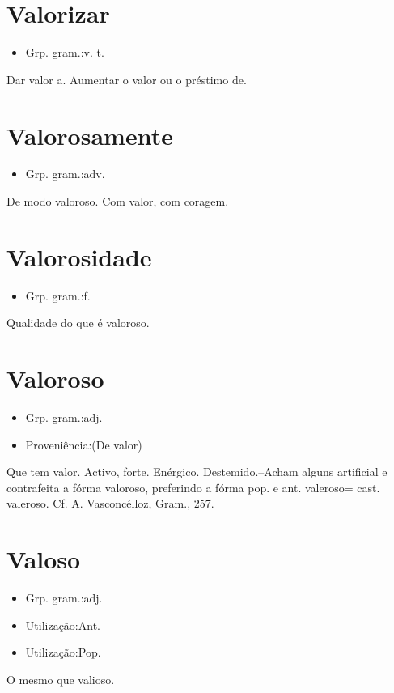 \documentclass{article}
\begin{document}
\section{Valorizar}
\begin{itemize}
\item {Grp. gram.:v. t.}
\end{itemize}
Dar valor a.
Aumentar o valor ou o préstimo de.
\section{Valorosamente}
\begin{itemize}
\item {Grp. gram.:adv.}
\end{itemize}
De modo valoroso.
Com valor, com coragem.
\section{Valorosidade}
\begin{itemize}
\item {Grp. gram.:f.}
\end{itemize}
Qualidade do que é valoroso.
\section{Valoroso}
\begin{itemize}
\item {Grp. gram.:adj.}
\end{itemize}
\begin{itemize}
\item {Proveniência:(De \textunderscore valor\textunderscore )}
\end{itemize}
Que tem valor.
Activo, forte.
Enérgico.
Destemido.--Acham alguns artificial e contrafeita a fórma \textunderscore valoroso\textunderscore , preferindo a fórma pop. e ant. \textunderscore valeroso\textunderscore  = cast. \textunderscore valeroso\textunderscore . Cf. A. Vasconcélloz, \textunderscore Gram.\textunderscore , 257.
\section{Valoso}
\begin{itemize}
\item {Grp. gram.:adj.}
\end{itemize}
\begin{itemize}
\item {Utilização:Ant.}
\end{itemize}
\begin{itemize}
\item {Utilização:Pop.}
\end{itemize}
O mesmo que \textunderscore valioso\textunderscore .
\end{document}
